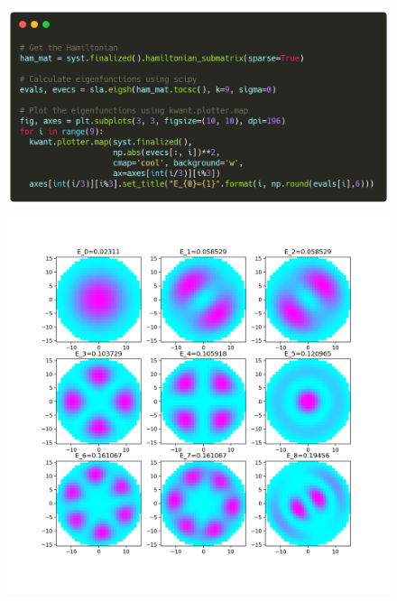 \documentclass[12pt]{article}
\numberwithin{equation}{section}
\begin{document}
\newpage
\begin{figure}
  \centering
  \begin{minipage}{0.49\textwidth}
    \centering
    \includegraphics[width=1.0\textwidth]{./media/example-eigenfunc-code.png} %
\end{minipage}\hfill
  \begin{minipage}{0.49\textwidth}
      \centering
      \includegraphics[width=1.0\textwidth]{./media/example-eigenfunc.png} %
  \end{minipage}
\end{figure}
\end{document}
